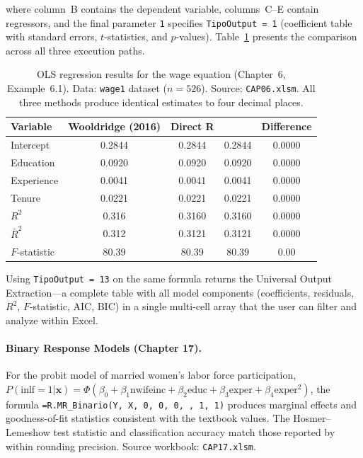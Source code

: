 where column~B contains the dependent variable, columns~C--E contain regressors, and the final parameter \texttt{1} specifies \texttt{TipoOutput = 1} (coefficient table with standard errors, $t$-statistics, and $p$-values). Table~\ref{tab:ols_results} presents the comparison across all three execution paths.

\begin{table}[htbp]
\centering
\caption{OLS regression results for the wage equation (Chapter~6, Example~6.1). Data: \texttt{wage1} dataset ($n = 526$). Source: \texttt{CAP06.xlsm}. All three methods produce identical estimates to four decimal places.}
\label{tab:ols_results}
\begin{tabular}{@{}lcccc@{}}
\toprule
\textbf{Variable} & \textbf{Wooldridge (2016)} & \textbf{Direct R} & \textbf{\neven{}} & \textbf{Difference} \\
\midrule
Intercept       & 0.2844  & 0.2844  & 0.2844  & 0.0000 \\
Education       & 0.0920  & 0.0920  & 0.0920  & 0.0000 \\
Experience      & 0.0041  & 0.0041  & 0.0041  & 0.0000 \\
Tenure          & 0.0221  & 0.0221  & 0.0221  & 0.0000 \\
\addlinespace
$R^2$           & 0.316   & 0.3160  & 0.3160  & 0.0000 \\
$\bar{R}^2$     & 0.312   & 0.3121  & 0.3121  & 0.0000 \\
$F$-statistic   & 80.39   & 80.39   & 80.39   & 0.00   \\
\bottomrule
\end{tabular}
\end{table}

Using \texttt{TipoOutput = 13} on the same formula returns the Universal Output Extraction---a complete table with all model components (coefficients, residuals, $R^2$, $F$-statistic, AIC, BIC) in a single multi-cell array that the user can filter and analyze within Excel.

\paragraph{Binary Response Models (Chapter 17).}
For the probit model of married women's labor force participation, $P(\text{inlf} = 1 | \mathbf{x}) = \Phi(\beta_0 + \beta_1 \text{nwifeinc} + \beta_2 \text{educ} + \beta_3 \text{exper} + \beta_4 \text{exper}^2)$, the \neven{} formula \texttt{=R.MR\_Binario(Y, X, 0, 0, 0, , 1, 1)} produces marginal effects and goodness-of-fit statistics consistent with the textbook values. The Hosmer--Lemeshow test statistic and classification accuracy match those reported by \citet{Wooldridge2016} within rounding precision. Source workbook: \texttt{CAP17.xlsm}.

